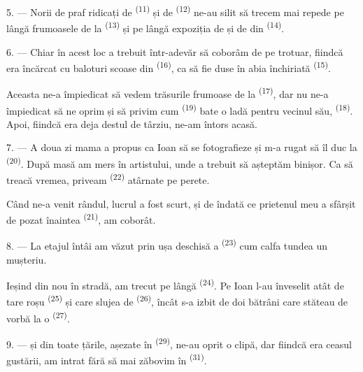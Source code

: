 5. --- Norii de praf ridicați de  \textsuperscript{(11)} și de
 \textsuperscript{(12)} ne-au silit să trecem mai repede
pe lângă frumoasele  de la 
\textsuperscript{(13)} și pe lângă expoziția de  și de
 din  \textsuperscript{(14)}.

6. --- Chiar în acest loc a trebuit într-adevăr să coborâm de pe trotuar, fiindcă
era încărcat cu baloturi scoase din 
\textsuperscript{(16)}, ca să fie duse în  abia închiriată
\textsuperscript{(15)}.

Aceasta ne-a împiedicat să vedem trăsurile frumoase de la 
\textsuperscript{(17)}, dar nu ne-a împiedicat să ne oprim și să privim cum
 \textsuperscript{(19)} bate o ladă pentru vecinul său,
 \textsuperscript{(18)}. Apoi, fiindcă
era deja destul de târziu, ne-am întors acasă.

\VUsaut{3.0mm}

7. --- A doua zi mama a propus ca Ioan să se fotografieze și m-a rugat să îl duc la
 \textsuperscript{(20)}. După masă am mers în 
artistului, unde a trebuit să așteptăm binișor. Ca să treacă vremea, priveam
 \textsuperscript{(22)} atârnate pe perete.

Când ne-a venit rândul, lucrul a fost scurt, și de îndată ce prietenul meu a sfârșit
de pozat înaintea  \textsuperscript{(21)}, am coborât.

8. --- La etajul întâi am văzut prin ușa deschisă a 
\textsuperscript{(23)} cum calfa tundea un mușteriu.

Ieșind din nou în stradă, am trecut pe lângă 
\textsuperscript{(24)}. Pe Ioan l-au înveselit atât de tare  roșu
\textsuperscript{(25)} și  care slujea de 
\textsuperscript{(26)}, încât s-a izbit de doi bătrâni care stăteau de vorbă la o
 \textsuperscript{(27)}.

\VUsaut{3.0mm}

9. ---  și  din toate țările, așezate în
  \textsuperscript{(29)}, ne-au oprit o clipă,
dar fiindcă era ceasul gustării, am intrat fără să mai zăbovim în
 \textsuperscript{(31)}.

